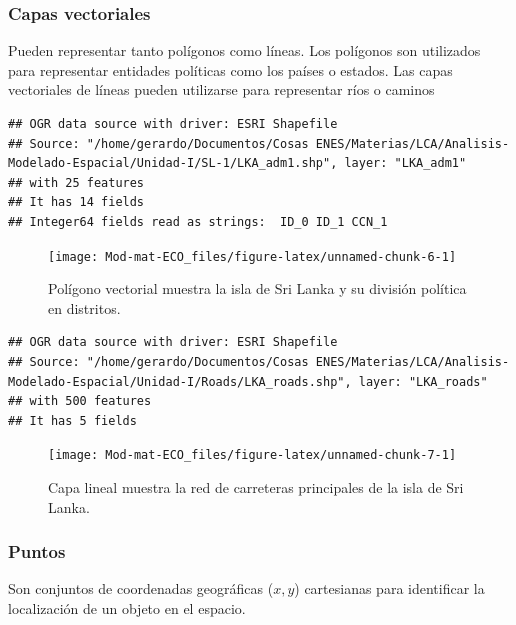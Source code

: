 \documentclass[
]{book}
\begin{document}
\hypertarget{capas-vectoriales}{%
\subsubsection{Capas vectoriales}\label{capas-vectoriales}}

Pueden representar tanto polígonos como líneas. Los polígonos son utilizados para representar entidades políticas como los países o estados. Las capas vectoriales de líneas pueden utilizarse para representar ríos o caminos

\begin{verbatim}
## OGR data source with driver: ESRI Shapefile 
## Source: "/home/gerardo/Documentos/Cosas ENES/Materias/LCA/Analisis-Modelado-Espacial/Unidad-I/SL-1/LKA_adm1.shp", layer: "LKA_adm1"
## with 25 features
## It has 14 fields
## Integer64 fields read as strings:  ID_0 ID_1 CCN_1
\end{verbatim}

\begin{figure}

{\centering \texttt{[image: Mod-mat-ECO\_files/figure-latex/unnamed-chunk-6-1]} 

}

\caption{Polígono vectorial muestra la isla de Sri Lanka y su división política en distritos.}\label{fig:unnamed-chunk-6}
\end{figure}

\begin{verbatim}
## OGR data source with driver: ESRI Shapefile 
## Source: "/home/gerardo/Documentos/Cosas ENES/Materias/LCA/Analisis-Modelado-Espacial/Unidad-I/Roads/LKA_roads.shp", layer: "LKA_roads"
## with 500 features
## It has 5 fields
\end{verbatim}

\begin{figure}

{\centering \texttt{[image: Mod-mat-ECO\_files/figure-latex/unnamed-chunk-7-1]} 

}

\caption{Capa lineal muestra la red de carreteras principales de la isla de Sri Lanka.}\label{fig:unnamed-chunk-7}
\end{figure}

\hypertarget{puntos}{%
\subsubsection{Puntos}\label{puntos}}

Son conjuntos de coordenadas geográficas (\(x, y\)) cartesianas para identificar la localización de un objeto en el espacio.
\end{document}
